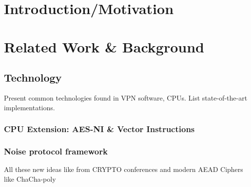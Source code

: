 \documentclass[IN,11pt,twoside,openright,master,english]{tumthesis}
\author{Maximilian~Pudelko}
\date{November 15, 2018}
\begin{document}
%


\maketitle%
\cleardoublepage


\begin{abstract}
	
\end{abstract}

\begin{otherlanguage}{ngerman}
	\begin{abstract}
		
	\end{abstract}
\end{otherlanguage}



\tableofcontents
\listoffigures
\listoftables

\startcontent

\chapter{Introduction/Motivation}

\chapter{Related Work \& Background}
\section{Technology}
	Present common technologies found in VPN software, CPUs. List state-of-the-art implementations.
	\subsection{CPU Extension: AES-NI \& Vector Instructions}
	\subsection{Noise protocol framework}
		All these new ideas like from CRYPTO conferences and modern AEAD Ciphers like ChaCha-poly
\end{document}
